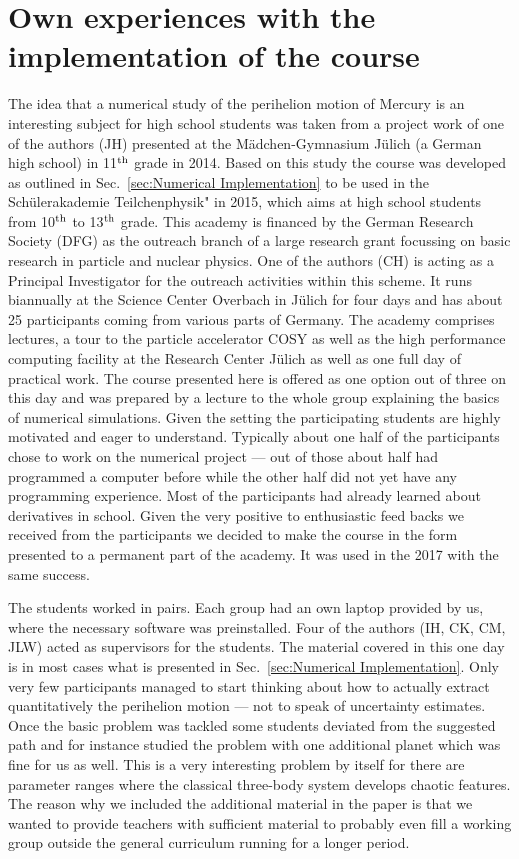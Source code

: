 \documentclass[12pt,ngerman,american]{iopart}
\begin{document}
\section{Own experiences with the implementation of the course}

The idea that a numerical study of the perihelion motion of Mercury is an interesting subject for high
school students was taken from a project work of one of the authors (JH) presented at the 
M\"adchen-Gymnasium J\"ulich (a German high school) in 11$^{\rm th}$ grade in 2014. Based on this study
the course was developed as outlined in Sec.~\ref{sec:Numerical Implementation} to be used in 
the Sch\"ulerakademie Teilchenphysik" in 2015, which aims at  high school students from 10$^{\rm th}$ to 
13$^{\rm th}$ grade. This academy is financed by the German Research Society (DFG) as the outreach
branch
of a large research grant focussing on basic research in particle and nuclear physics.
One of the authors (CH) is acting as a Principal Investigator for the outreach
activities within this scheme. It runs biannually
at the Science Center Overbach in J\"ulich
for four days and has about 25 participants coming from various parts of Germany. 
The academy comprises lectures, a tour to the particle accelerator
COSY as well as the high performance computing facility at the Research Center J\"ulich as well
as one full day of practical work. The course presented here
 is offered as one option out of three on this day and was prepared
by a lecture to the whole group explaining the basics of numerical simulations. 
Given the setting the participating students
are highly motivated and eager to understand. Typically about one half of the participants chose to
work on the numerical project --- out of those about half had programmed a computer before while
the other half did not yet have any programming experience. Most of the participants had already
learned about derivatives in school. Given the very positive to enthusiastic 
feed backs we received from the participants we decided to make the course in the form presented
to a permanent part of the academy. It was used in the 2017 with the same success.

The students worked in pairs. Each group had an own laptop provided by us, where the necessary
software was preinstalled. Four of the authors (IH, CK, CM, JLW) acted as supervisors for
the students. 
The material covered in this one day is in most cases what is presented in Sec.~\ref{sec:Numerical Implementation}.
Only very few participants managed to start thinking about how to actually extract quantitatively the
perihelion motion --- not to speak of uncertainty estimates.
Once the basic problem was tackled some students deviated from the suggested path and for
instance studied the problem with one additional planet which was fine for us as well. This is
a very interesting problem by itself for there are parameter ranges where the classical three-body
system develops chaotic features.
 The reason why we included the
additional material in the paper is that we wanted to provide teachers with sufficient material to
probably even fill a working group outside the general curriculum running for a longer period.
\end{document}
